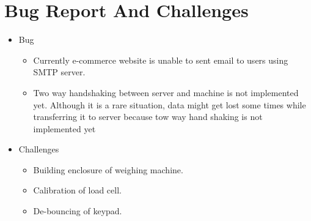 \documentclass[a4paper,12pt,oneside]{book}
\begin{document}
\section{Bug Report And Challenges}
\begin{itemize}
\item Bug
\begin{itemize}
   \item Currently e-commerce website is unable to sent email to users using SMTP server.
   \item Two way handshaking between server and machine is not implemented yet. Although it is a rare situation, data might get lost some times while transferring it to server because tow way hand shaking is not implemented yet
\end{itemize}
\item Challenges
\begin{itemize}
   \item Building enclosure of weighing machine.
   \item Calibration of load cell.
   \item De-bouncing of keypad.
\end{itemize}
\end{itemize}
\end{document}

